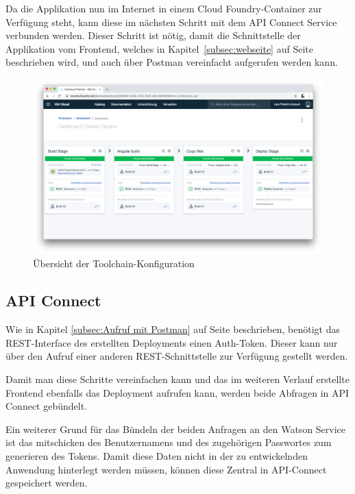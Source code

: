 Da die Applikation nun im Internet in einem Cloud Foundry-Container zur Verfügung steht, kann diese im nächsten Schritt
mit dem API Connect Service verbunden werden. Dieser Schritt ist nötig, damit die Schnittstelle der Applikation vom
Frontend, welches in Kapitel~\ref{subsec:webseite} auf Seite~\pageref{subsec:webseite} beschrieben wird, und auch über
Postman vereinfacht aufgerufen werden kann.

\begin{figure}[h]
    \centering
    \includegraphics[width=\textwidth]{images/kapitel_3/toolchain_pipeline.png}
    \caption{Übersicht der Toolchain-Konfiguration}
    \label{fig:umsetzung_toolchain_pipeline}
\end{figure}

\subsection{API Connect}
Wie in Kapitel \ref{subsec:Aufruf mit Postman} auf Seite \pageref{subsec:Aufruf mit Postman} beschrieben, benötigt das
REST-Interface des erstellten Deployments einen Auth-Token. Dieser kann nur über den Aufruf einer anderen
REST-Schnittstelle zur Verfügung gestellt werden.

Damit man diese Schritte vereinfachen kann und das im weiteren Verlauf erstellte Frontend ebenfalls das Deployment aufrufen
kann, werden beide Abfragen in API Connect gebündelt.

Ein weiterer Grund für das Bündeln der beiden Anfragen an den Watson Service ist das mitschicken des Benutzernamens und
des zugehörigen Passwortes zum generieren des Tokens. Damit diese Daten nicht in der zu entwickelnden Anwendung hinterlegt
werden müssen, können diese Zentral in API-Connect gespeichert werden.

